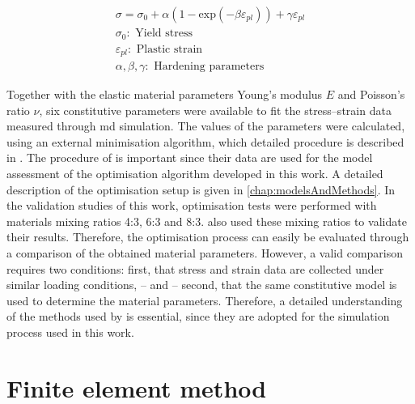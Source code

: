 \begin{gather} 
    \sigma = \sigma_0 + \alpha(1 - \text{exp}(-\beta \varepsilon_{pl})) + \gamma \varepsilon_{pl} \label{eq: voce} \\ 
    \sigma_0: \text{ Yield stress} \nonumber\\
    \varepsilon_{pl}: \text{ Plastic strain} \nonumber \\
    \alpha, \beta,  \gamma: \text{ Hardening parameters} \nonumber
\end{gather}


Together with the elastic material parameters Young's modulus $E$ and Poisson's ratio $\nu$, six constitutive parameters were available to fit the stress–strain data measured through \acrshort{md} simulation. The values of the parameters were calculated, using an external minimisation algorithm, which detailed procedure is described in \cite{ries_deciphering_nodate}. The procedure of \citet{ries_deciphering_nodate} is important since their data are used for the model assessment of the optimisation algorithm developed in this work. A detailed description of the optimisation setup is given in \autoref{chap:modelsAndMethods}. In the validation studies of this work, optimisation tests were performed with materials mixing ratios 4:3, 6:3 and 8:3. \citet{ries_deciphering_nodate} also used these mixing ratios to validate their results. Therefore, the optimisation process can easily be evaluated through a comparison of the obtained material parameters. However, a valid comparison requires two conditions: first, that stress and strain data are collected under similar loading conditions, – and – second, that the same constitutive model is used to determine the material parameters. Therefore, a detailed understanding of the methods used by \citet{ries_deciphering_nodate} is essential, since they are adopted for the simulation process used in this work.  



\section{Finite element method} \label{sec: FEMBasics}

